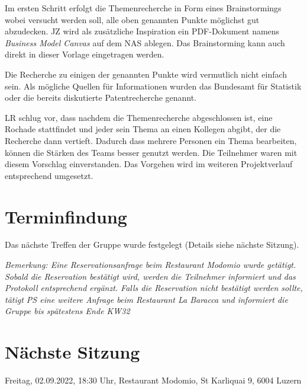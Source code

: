 \documentclass[10pt]{extarticle}
\begin{document}
Im ersten Schritt erfolgt die Themenrecherche in Form eines Brainstormings wobei versucht werden soll, alle oben genannten Punkte möglichst gut abzudecken. JZ wird als zusätzliche Inspiration ein PDF-Dokument namens \textit{Business Model Canvas} auf dem NAS ablegen. Das Brainstorming kann auch direkt in dieser Vorlage eingetragen werden. 
\par
\vspace{0.2cm}
Die Recherche zu einigen der genannten Punkte wird vermutlich nicht einfach sein. Als mögliche Quellen für Informationen wurden das Bundesamt für Statistik oder die bereits diskutierte Patentrecherche genannt. 
\par\vspace{0.2cm}
LR schlug vor, dass nachdem die Themenrecherche abgeschlossen ist, eine Rochade stattfindet und jeder sein Thema an einen Kollegen abgibt, der die Recherche dann vertieft. Dadurch dass mehrere Personen ein Thema bearbeiten, können die Stärken des Teams besser genutzt werden. Die Teilnehmer waren mit diesem Vorschlag einverstanden. Das Vorgehen wird im weiteren Projektverlauf entsprechend umgesetzt.

\section{Terminfindung}
Das nächste Treffen der Gruppe wurde festgelegt (Details siehe nächste Sitzung).

\par
\vspace{0.5cm}
\textit{Bemerkung: Eine Reservationsanfrage beim Restaurant Modomio wurde getätigt. Sobald die Reservation bestätigt wird, werden die Teilnehmer informiert und das Protokoll entsprechend ergänzt. Falls die Reservation nicht bestätigt werden sollte, tätigt PS eine weitere Anfrage beim Restaurant La Baracca und informiert die Gruppe bis spätestens Ende KW32}

\vspace{2cm}
\section*{Nächste Sitzung}

Freitag, 02.09.2022, 18:30 Uhr, Restaurant Modomio, St Karliquai 9, 6004 Luzern
\end{document}
